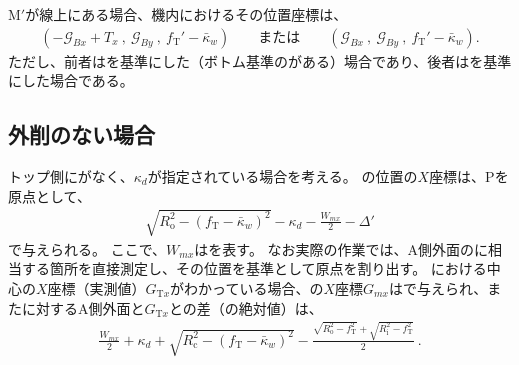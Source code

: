 \clearpage
\KeywayCenter M$'$が\TopOutcutCenter 線上にある場合、機内におけるその位置座標は、
\begin{align*}
  \left(
    -\mathcal G_{Bx}+T_x\ ,\
    \mathcal G_{By}\ ,\
    f_\mathrm T'-\bar\kappa_w
  \right) \qquad
  \text{または}\qquad
  \left(
    \mathcal G_{Bx}\ ,\
    \mathcal G_{By}\ ,\
    f_\mathrm T'-\bar\kappa_w
  \right).
\end{align*}
ただし、前者は\BottomOutcut を基準にした（ボトム基準の\CenterlineEndFaceDif がある）場合であり、後者は\TopOutcut を基準にした場合である。





\subsection{外削のない場合}
トップ側に\Outcut がなく、\textbf{\AsideKeywayDepth}$\kappa_d$が指定されている場合を考える。
\KeywayCenter の位置の$X$座標は、\TableCenter Pを原点として、
\begin{align}
  \label{eq:mizocenterA}
  \sqrt{R_\mathrm o^2-(f_\mathrm T-\bar\kappa_w)^2}-\kappa_d-\frac{W_{mx}}2
  -\Delta'
\end{align}
で与えられる。
ここで、$W_{mx}$は\KeywayACOD を表す。
なお実際の作業では、A側外面の\KeywayCenter に相当する箇所を直接測定し、その位置を基準として原点を割り出す。
\TopEndFace における中心の$X$座標（実測値）$G_{\mathrm Tx}$がわかっている場合、\KeywayCenter の$X$座標$G_{mx}$はで与えられ、また\KeywayCenter に対するA側外面と$G_{\mathrm Tx}$との差（の絶対値）は、
\begin{align}
  \label{eq:mizocenterAd}
  \frac{W_{mx}}2+\kappa_d
  +\sqrt{R_\mathrm c^2-(f_\mathrm T-\bar\kappa_w)^2}
  -\frac{\sqrt{R_\mathrm o^2-f_\mathrm T^2}+\sqrt{R_\mathrm i^2-f_\mathrm T^2}}2\ .
\end{align}


